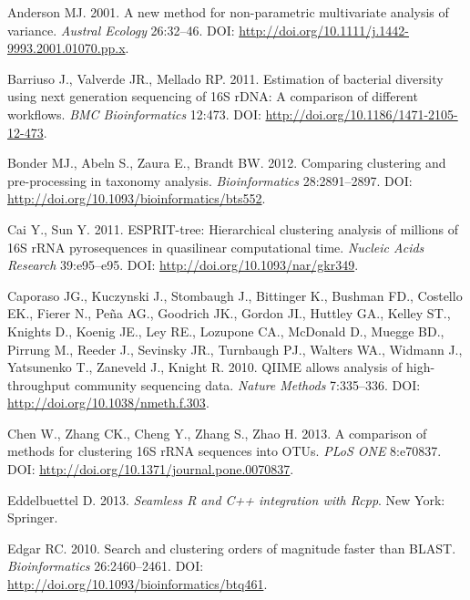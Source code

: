 \documentclass[11pt,]{article}
\begin{document}
Anderson MJ. 2001. A new method for non-parametric multivariate analysis
of variance. \emph{Austral Ecology} 26:32--46. DOI:
\url{http://doi.org/10.1111/j.1442-9993.2001.01070.pp.x}.

Barriuso J., Valverde JR., Mellado RP. 2011. Estimation of bacterial
diversity using next generation sequencing of 16S rDNA: A comparison of
different workflows. \emph{BMC Bioinformatics} 12:473. DOI:
\url{http://doi.org/10.1186/1471-2105-12-473}.

Bonder MJ., Abeln S., Zaura E., Brandt BW. 2012. Comparing clustering
and pre-processing in taxonomy analysis. \emph{Bioinformatics}
28:2891--2897. DOI: \url{http://doi.org/10.1093/bioinformatics/bts552}.

Cai Y., Sun Y. 2011. ESPRIT-tree: Hierarchical clustering analysis of
millions of 16S rRNA pyrosequences in quasilinear computational time.
\emph{Nucleic Acids Research} 39:e95--e95. DOI:
\url{http://doi.org/10.1093/nar/gkr349}.

Caporaso JG., Kuczynski J., Stombaugh J., Bittinger K., Bushman FD.,
Costello EK., Fierer N., Peña AG., Goodrich JK., Gordon JI., Huttley
GA., Kelley ST., Knights D., Koenig JE., Ley RE., Lozupone CA., McDonald
D., Muegge BD., Pirrung M., Reeder J., Sevinsky JR., Turnbaugh PJ.,
Walters WA., Widmann J., Yatsunenko T., Zaneveld J., Knight R. 2010.
QIIME allows analysis of high-throughput community sequencing data.
\emph{Nature Methods} 7:335--336. DOI:
\url{http://doi.org/10.1038/nmeth.f.303}.

Chen W., Zhang CK., Cheng Y., Zhang S., Zhao H. 2013. A comparison of
methods for clustering 16S rRNA sequences into OTUs. \emph{PLoS ONE}
8:e70837. DOI: \url{http://doi.org/10.1371/journal.pone.0070837}.

Eddelbuettel D. 2013. \emph{Seamless R and C++ integration with Rcpp}.
New York: Springer.

Edgar RC. 2010. Search and clustering orders of magnitude faster than
BLAST. \emph{Bioinformatics} 26:2460--2461. DOI:
\url{http://doi.org/10.1093/bioinformatics/btq461}.
\end{document}
